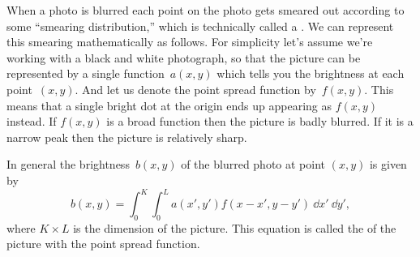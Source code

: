 \documentclass[12pt]{article}
\begin{document}
\begin{exercises}
When a photo is blurred each point on the photo gets smeared out
according to some ``smearing distribution,'' which is technically called a
.  We can represent this smearing
mathematically as follows.  For simplicity let's assume we're working with
a black and white photograph, so that the picture can be represented by a
single function~$a(x,y)$ which tells you the brightness at each
point~$(x,y)$.  And let us denote the point spread function by~$f(x,y)$.
This means that a single bright dot at the origin ends up appearing as
$f(x,y)$ instead.  If $f(x,y)$ is a broad function then the picture is
badly blurred.  If it is a narrow peak then the picture is relatively
sharp.

In general the brightness~$b(x,y)$ of the blurred photo at point $(x,y)$ is
given by
\begin{displaymath}
b(x,y) = \int_0^K \int_0^L a(x',y') f(x-x',y-y') \>\dd x'\>\dd y',
\end{displaymath}
where $K\times L$ is the dimension of the picture.  This equation is called
the  of the picture with the point spread
function.


\end{exercises}
\end{document}

